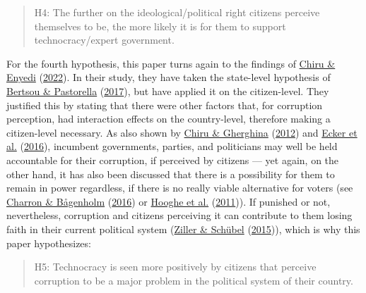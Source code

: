 \documentclass[
  12pt,
  english,
]{article}
\begin{document}
\begin{quote}
H4: The further on the ideological/political right citizens perceive
themselves to be, the more likely it is for them to support
technocracy/expert government.
\end{quote}

For the fourth hypothesis, this paper turns again to the findings of
\protect\hyperlink{ref-chiru2022wants}{Chiru \& Enyedi}
(\protect\hyperlink{ref-chiru2022wants}{2022}). In their study, they
have taken the state-level hypothesis of
\protect\hyperlink{ref-bertsou2017technocratic}{Bertsou \& Pastorella}
(\protect\hyperlink{ref-bertsou2017technocratic}{2017}), but have
applied it on the citizen-level. They justified this by stating that
there were other factors that, for corruption perception, had
interaction effects on the country-level, therefore making a
citizen-level necessary. As also shown by
\protect\hyperlink{ref-chiru2012voter}{Chiru \& Gherghina}
(\protect\hyperlink{ref-chiru2012voter}{2012}) and
\protect\hyperlink{ref-ecker2016corruption}{Ecker et al.}
(\protect\hyperlink{ref-ecker2016corruption}{2016}), incumbent
governments, parties, and politicians may well be held accountable for
their corruption, if perceived by citizens --- yet again, on the other
hand, it has also been discussed that there is a possibility for them to
remain in power regardless, if there is no really viable alternative for
voters (see \protect\hyperlink{ref-charron2016ideology}{Charron \&
Bågenholm} (\protect\hyperlink{ref-charron2016ideology}{2016}) or
\protect\hyperlink{ref-hooghe2011distrusting}{Hooghe et al.}
(\protect\hyperlink{ref-hooghe2011distrusting}{2011})). If punished or
not, nevertheless, corruption and citizens perceiving it can contribute
to them losing faith in their current political system
(\protect\hyperlink{ref-ziller2015pure}{Ziller \& Schübel}
(\protect\hyperlink{ref-ziller2015pure}{2015})), which is why this paper
hypothesizes:

\begin{quote}
H5: Technocracy is seen more positively by citizens that perceive
corruption to be a major problem in the political system of their
country.
\end{quote}
\end{document}
